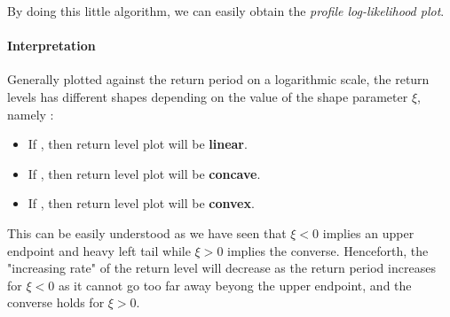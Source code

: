 By doing this little algorithm, we can easily obtain the \emph{profile log-likelihood plot}. 

\paragraph*{Interpretation}

Generally plotted against the return period on a logarithmic scale, the return levels has different shapes depending on the value of the shape parameter $\xi$, namely :

\begin{itemize}
	\item If , then return level plot will be \textbf{linear}.
     \item If , then return level plot will be \textbf{concave}.
     \item If , then return level plot will be \textbf{convex}.
\end{itemize}

This can be easily understood as we have seen that $\xi<0$ implies an upper endpoint and heavy left tail while $\xi>0$ implies the converse. Henceforth, the "increasing rate" of the return level will decrease as the return period increases for $\xi<0$ as it cannot go too far away beyong the upper endpoint, and the converse holds for $\xi>0$.

